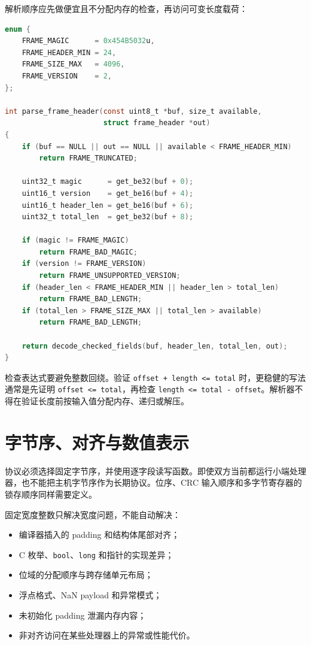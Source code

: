 解析顺序应先做便宜且不分配内存的检查，再访问可变长度载荷：

\begin{lstlisting}[language=C,caption={有界消息头解析骨架}]
enum {
    FRAME_MAGIC      = 0x454B5032u,
    FRAME_HEADER_MIN = 24,
    FRAME_SIZE_MAX   = 4096,
    FRAME_VERSION    = 2,
};

int parse_frame_header(const uint8_t *buf, size_t available,
                       struct frame_header *out)
{
    if (buf == NULL || out == NULL || available < FRAME_HEADER_MIN)
        return FRAME_TRUNCATED;

    uint32_t magic      = get_be32(buf + 0);
    uint16_t version    = get_be16(buf + 4);
    uint16_t header_len = get_be16(buf + 6);
    uint32_t total_len  = get_be32(buf + 8);

    if (magic != FRAME_MAGIC)
        return FRAME_BAD_MAGIC;
    if (version != FRAME_VERSION)
        return FRAME_UNSUPPORTED_VERSION;
    if (header_len < FRAME_HEADER_MIN || header_len > total_len)
        return FRAME_BAD_LENGTH;
    if (total_len > FRAME_SIZE_MAX || total_len > available)
        return FRAME_BAD_LENGTH;

    return decode_checked_fields(buf, header_len, total_len, out);
}
\end{lstlisting}

检查表达式要避免整数回绕。验证 \texttt{offset + length <= total} 时，更稳健的写法通常是先证明 \texttt{offset <= total}，再检查 \texttt{length <= total - offset}。解析器不得在验证长度前按输入值分配内存、递归或解压。

\section{字节序、对齐与数值表示}

协议必须选择固定字节序，并使用逐字段读写函数。即使双方当前都运行小端处理器，也不能把主机字节序作为长期协议。位序、CRC 输入顺序和多字节寄存器的锁存顺序同样需要定义。

固定宽度整数只解决宽度问题，不能自动解决：

\begin{itemize}
  \item 编译器插入的 padding 和结构体尾部对齐；
  \item C 枚举、\texttt{bool}、\texttt{long} 和指针的实现差异；
  \item 位域的分配顺序与跨存储单元布局；
  \item 浮点格式、NaN payload 和异常模式；
  \item 未初始化 padding 泄漏内存内容；
  \item 非对齐访问在某些处理器上的异常或性能代价。
\end{itemize}

